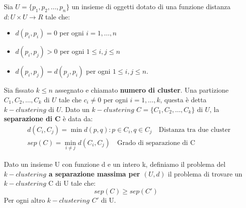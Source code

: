 Sia $U = \{p_1, p_2, \dots, p_n\}$ un insieme di oggetti dotato di una funzione distanza $d:U \times U \rightarrow R$ tale che:
\begin{itemize}
    \item $d(p_i,p_i)=0$ per ogni $i=1,\dots , n$
    \item $d(p_i,p_j)>0$ per ogni $1\leq i,j \leq n$
    \item $d(p_i,p_j) = d(p_j,p_i)$ per ogni $1\leq i,j \leq n$.
\end{itemize}
Sia fissato $k \leq n$ assegnato e chiamato \textbf{numero di cluster}. Una partizione $C_1, C_2, \dots, C_k$ di $U$ tale che $c_i \neq 0$ per ogni $i=1,\dots, k$, questa è detta $k-clustering$ di $U$. 
Dato un $k-clustering$ $C=\{C_1, C_2, \dots, C_k\}$ di $U$, la \textbf{separazione di C} è data da:
\begin{align*}
    &d(C_i,C_j) = \min d(p,q) : p\in C_i, q \in C_j \quad \text{Distanza tra due cluster}\\
    &sep(C) = \min_{i\neq j}d(C_i,C_j) \quad \text{Grado di separazione di C}
\end{align*}

Dato un insieme U con funzione d e un intero k, definiamo il problema del \textbf{$k-clustering$ a separazione massima per $(U, d)$} il problema di trovare un $k-clustering$ C di U tale che:
\[sep(C)\geq sep(C')\]
Per ogni altro $k-clustering$ $C'$ di U.


